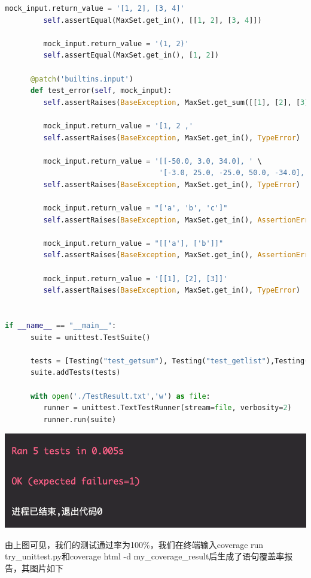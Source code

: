 \documentclass{article}
\begin{document}
\begin{lstlisting}[language = python]
         mock_input.return_value = '[1, 2], [3, 4]'
         self.assertEqual(MaxSet.get_in(), [[1, 2], [3, 4]])

         mock_input.return_value = '(1, 2)'
         self.assertEqual(MaxSet.get_in(), [1, 2])

      @patch('builtins.input')
      def test_error(self, mock_input):
         self.assertRaises(BaseException, MaxSet.get_sum([[1], [2], [3]]), TypeError)

         mock_input.return_value = '[1, 2 ,'
         self.assertRaises(BaseException, MaxSet.get_in(), TypeError)

         mock_input.return_value = '[[-50.0, 3.0, 34.0], ' \
                                    '[-3.0, 25.0, -25.0, 50.0, -34.0], [-8.0, 9.0, 7.0, -31.0, -2.0]])'
         self.assertRaises(BaseException, MaxSet.get_in(), TypeError)

         mock_input.return_value = "['a', 'b', 'c']"
         self.assertRaises(BaseException, MaxSet.get_in(), AssertionError)

         mock_input.return_value = "[['a'], ['b']]"
         self.assertRaises(BaseException, MaxSet.get_in(), AssertionError)

         mock_input.return_value = '[[1], [2], [3]]'
         self.assertRaises(BaseException, MaxSet.get_in(), TypeError)


if __name__ == "__main__":
      suite = unittest.TestSuite()

      tests = [Testing("test_getsum"), Testing("test_getlist"),Testing("test_sum2D"), Testing("test_in"), Testing("test_error")]
      suite.addTests(tests)

      with open('./TestResult.txt','w') as file:
         runner = unittest.TextTestRunner(stream=file, verbosity=2)
         runner.run(suite)
\end{lstlisting}
\begin{center}
   \includegraphics[scale = 1]{31.png}
\end{center}
由上图可见，我们的测试通过率为100\%，我们在终端输入coverage run try\_unittest.py和coverage html -d my\_coverage\_result后生成了语句覆盖率报告，其图片如下
\end{document}
